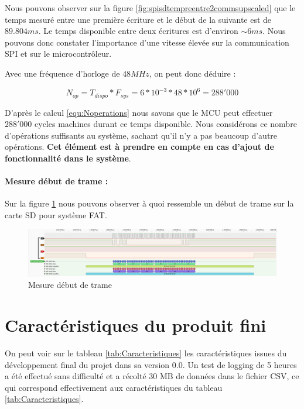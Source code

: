 {	Nous pouvons observer sur la figure \ref{fig:spisdtempreentre2commsupscaled} que le temps mesuré entre une première écriture et le début de la suivante est de $89.804 ms$. Le temps disponible entre deux écritures est d'environ $\sim6ms$.
	Nous pouvons donc constater l'importance d'une vitesse élevée sur la communication SPI et sur le microcontrôleur.
	
	Avec une fréquence d'horloge de $48MHz$, on peut donc déduire :
	
	\begin{equation} 
		\label{equ:Noperations}
		N_{op} = T_{dispo} * F_{sys} = 6*10^{-3} * 48*10^{6} = 288'000 
	\end{equation}
	
	D'après le calcul \ref{equ:Noperations} nous savons que le MCU peut effectuer $288'000$ cycles machines durant ce temps disponible. Nous considérons ce nombre d'opérations suffisants au système, sachant qu'il n'y a pas beaucoup d'autre opérations. \textbf{Cet élément est à prendre en compte en cas d'ajout de fonctionnalité dans le système}.
	
	\paragraph{Mesure début de trame :} Sur la figure \ref{fig:spisdtramedepartupscaled} nous pouvons observer à quoi ressemble un début de trame sur la carte SD pour système FAT.
	
	\begin{figure}[h]
		\centering
		\includegraphics[width=1\linewidth]{Mesures/SPI_SD_Trame_Depart_Upscaled}
		\caption{Mesure début de trame}
		\label{fig:spisdtramedepartupscaled}
	\end{figure}
	
	
	
}

\clearpage

\section{Caractéristiques du produit fini}



On peut voir sur le tableau \ref{tab:Caracteristiques} les caractéristiques issues du développement final du projet dans sa version 0.0. Un test de logging de 5 heures a été effectué sans difficulté et a récolté 30 MB de données dans le fichier CSV, ce qui correspond effectivement aux caractéristiques du tableau \ref{tab:Caracteristiques}.